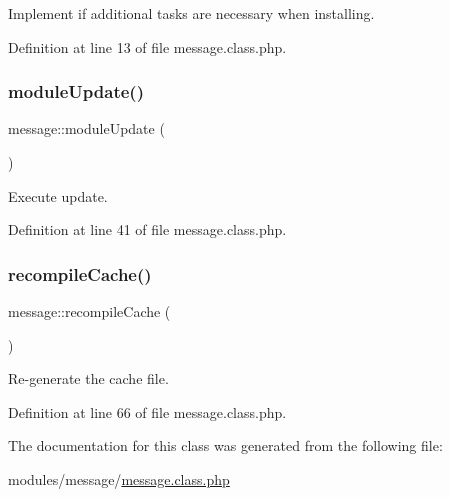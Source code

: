 Implement if additional tasks are necessary when installing. 



Definition at line 13 of file message.\+class.\+php.

\mbox{\label{classmessage_ad57e7bdf84c463626454a18ead0ff1ce}} 
\subsubsection{\texorpdfstring{module\+Update()}{moduleUpdate()}}
{\footnotesize\ttfamily message\+::module\+Update (\begin{DoxyParamCaption}{ }\end{DoxyParamCaption})}



Execute update. 



Definition at line 41 of file message.\+class.\+php.

\mbox{\label{classmessage_afb564d4a4be415199786f368e9d6a243}} 
\subsubsection{\texorpdfstring{recompile\+Cache()}{recompileCache()}}
{\footnotesize\ttfamily message\+::recompile\+Cache (\begin{DoxyParamCaption}{ }\end{DoxyParamCaption})}



Re-\/generate the cache file. 



Definition at line 66 of file message.\+class.\+php.



The documentation for this class was generated from the following file\+:\begin{DoxyCompactItemize}
\item 
modules/message/\hyperlink{message_8class_8php}{message.\+class.\+php}\end{DoxyCompactItemize}
